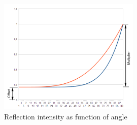 \documentclass[twocolumn]{report}
\newenvironment{twocol}[0]{%
\begin{list}{}{%
\onecolumn
\setlength{\leftmargin}{0.15cm}%
\setlength{\rightmargin}{0.15cm}%
\setlength{\topmargin}{0cm}%
\setlength{\headheight}{0cm}%
\setlength{\headsep}{0cm}%
\setlength{\textheight}{24cm}%
}%
\item[]}{\end{list}}
\begin{document}
\begin{twocol}
\begin{figure}[h]
	\centering
	\includegraphics[width=0.6\textwidth]{images/curves.png}
	\caption{Reflection intensity as function of angle}
\end{figure}

\end{twocol}
\end{document}

